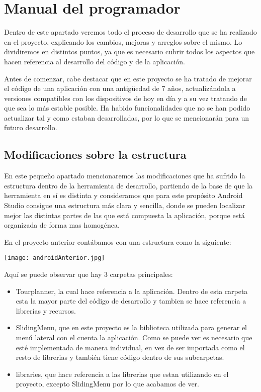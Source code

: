 \section{Manual del programador}

Dentro de este apartado veremos todo el proceso de desarrollo que se ha realizado en el proyecto, explicando los cambios, mejoras y arreglos sobre el mismo. Lo dividiremos en distintos puntos, ya que es necesario cubrir todos los aspectos que hacen referencia al desarrollo del código y de la aplicación.

Antes de comenzar, cabe destacar que en este proyecto se ha tratado de mejorar el código de una aplicación con una antigüedad de 7 años, actualizándola a versiones compatibles con los dispositivos de hoy en día y a su vez tratando de que sea lo más estable posible. Ha habido funcionalidades que no se han podido actualizar tal y como estaban desarrolladas, por lo que se mencionarán para un futuro desarrollo.

\subsection{Modificaciones sobre la estructura}

En este pequeño apartado mencionaremos las modificaciones que ha sufrido la estructura dentro de la herramienta de desarrollo, partiendo de la base de que la herramienta en sí es distinta y consideramos que para este propósito Android Studio consigue una estructura más clara y sencilla, donde se pueden localizar mejor las distintas partes de las que está compuesta la aplicación, porque está organizada de forma mas homogénea.

En el proyecto anterior contábamos con una estructura como la siguiente:

\texttt{[image: androidAnterior.jpg]}

Aquí se puede observar que hay 3 carpetas principales:

\begin{itemize}
\item Tourplanner, la cual hace referencia a la aplicación. Dentro de esta carpeta esta la mayor parte del código de desarrollo y tambien se hace referencia a librerías y recursos.
\item SlidingMenu, que en este proyecto es la biblioteca utilizada para generar el menú lateral con el cuenta la aplicación. Como se puede ver es necesario que esté implementada de manera individual, en vez de ser importada como el resto de librerias y también tiene código dentro de sus subcarpetas.
\item libraries, que hace referencia a las librerias que estan utilizando en el proyecto, excepto SlidingMenu por lo que acabamos de ver.
\end{itemize}

